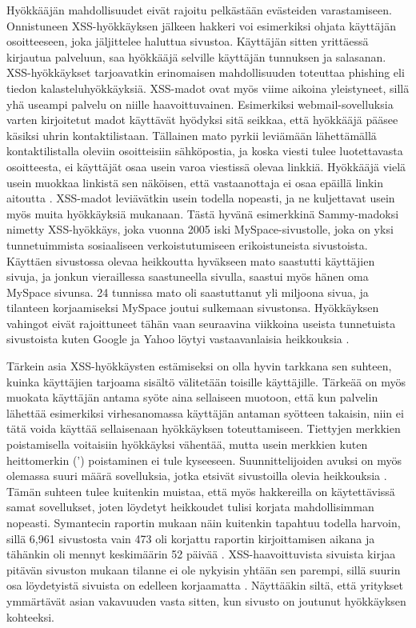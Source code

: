 Hyökkääjän mahdollisuudet eivät rajoitu pelkästään evästeiden varastamiseen. Onnistuneen XSS-hyökkäyksen jälkeen hakkeri voi esimerkiksi ohjata
käyttäjän osoitteeseen, joka jäljittelee haluttua sivustoa. Käyttäjän sitten yrittäessä kirjautua palveluun, saa hyökkääjä selville käyttäjän tunnuksen ja
salasanan. XSS-hyökkäykset tarjoavatkin erinomaisen mahdollisuuden toteuttaa phishing eli tiedon kalasteluhyökkäyksiä. XSS-madot ovat
myös viime aikoina yleistyneet, sillä yhä useampi palvelu on niille haavoittuvainen. Esimerkiksi webmail-sovelluksia varten kirjoitetut madot 
käyttävät hyödyksi sitä seikkaa, että hyökkääjä pääsee käsiksi uhrin kontaktilistaan. Tällainen mato pyrkii leviämään lähettämällä 
kontaktilistalla oleviin osoitteisiin sähköpostia, ja koska viesti tulee luotettavasta osoitteesta, ei käyttäjät osaa usein varoa viestissä
olevaa linkkiä. Hyökkääjä vielä usein muokkaa linkistä sen näköisen, että vastaanottaja ei osaa epäillä linkin aitoutta \cite{WEB2}. 
XSS-madot leviävätkin usein todella nopeasti, ja ne kuljettavat usein myös muita hyökkäyksiä mukanaan. Tästä hyvänä esimerkkinä
Sammy-madoksi nimetty XSS-hyökkäys, joka vuonna 2005 iski MySpace-sivustolle, joka on yksi tunnetuimmista sosiaaliseen verkoistutumiseen
erikoistuneista sivustoista. Käyttäen sivustossa olevaa heikkoutta hyväkseen mato saastutti käyttäjien sivuja, ja jonkun vieraillessa 
saastuneella sivulla, saastui myös hänen oma MySpace sivunsa. 24 tunnissa mato oli saastuttanut yli miljoona sivua, ja tilanteen korjaamiseksi
MySpace joutui sulkemaan sivustonsa. Hyökkäyksen vahingot eivät rajoittuneet tähän vaan seuraavina viikkoina useista tunnetuista sivustoista
kuten Google ja Yahoo löytyi vastaavanlaisia heikkouksia \cite{WEB2b}.

Tärkein asia XSS-hyökkäysten estämiseksi on olla hyvin tarkkana sen suhteen, kuinka käyttäjien tarjoama sisältö välitetään toisille käyttäjille.
Tärkeää on myös muokata käyttäjän antama syöte aina sellaiseen muotoon, että kun palvelin lähettää esimerkiksi virhesanomassa käyttäjän antaman syötteen
takaisin, niin ei tätä voida käyttää sellaisenaan hyökkäyksen toteuttamiseen. Tiettyjen merkkien poistamisella voitaisiin hyökkäyksi vähentää,
mutta usein merkkien kuten heittomerkin (') poistaminen ei tule kyseeseen. Suunnittelijoiden avuksi on myös olemassa suuri määrä sovelluksia, jotka
etsivät sivustoilla olevia heikkouksia \cite{WEB2}. Tämän suhteen tulee kuitenkin muistaa, että myös hakkereilla on käytettävissä samat sovellukset, joten 
löydetyt heikkoudet tulisi korjata mahdollisimman nopeasti. Symantecin raportin mukaan näin kuitenkin tapahtuu todella harvoin, sillä 6,961 
sivustosta vain 473 oli korjattu raportin kirjoittamisen aikana ja tähänkin oli mennyt keskimäärin 52 päivää \cite{SYM}. XSS-haavoittuvista sivuista
kirjaa pitävän sivuston mukaan tilanne ei ole nykyisin yhtään sen parempi, sillä suurin osa löydetyistä sivuista on edelleen korjaamatta \cite{XSS}.
Näyttääkin siltä, että yritykset ymmärtävät asian vakavuuden vasta sitten, kun sivusto on joutunut hyökkäyksen kohteeksi.


